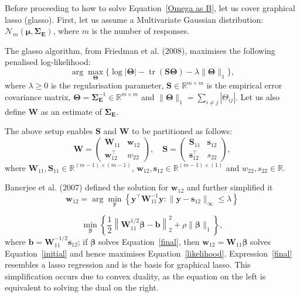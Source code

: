 Before proceeding to how to solve Equation~\ref{Omega as B}, let us cover graphical lasso (glasso). First, let us assume a Multivariate Gaussian distribution:
\(\mathcal{N}_m(\boldsymbol{\mu},\mathbf{\Sigma_E})\), where $m$ is the number of responses. 

The glasso algorithm, from Friedman et al. (2008), maximises the following penalised log-likelihood:
\begin{equation}
\arg \max_{\boldsymbol{\Theta}}\{ \log |\boldsymbol{\Theta}| - \operatorname{tr}(\mathbf{S} \boldsymbol{\Theta}) - \lambda \|\boldsymbol{\Theta}\|_1\},
\label{likelihood}
\end{equation}
where $\lambda \geq 0$ is the regularisation parameter, $\mathbf{S}\in \mathbb{R}^{m \times m}$ is the empirical error covariance matrix, $\mathbf{\Theta} = \mathbf{\Sigma}^{-1}_\mathbf{E} \in \mathbb{R}^{m \times m}$ and $\|\boldsymbol{\Theta}\|_1 = \sum_{i \ne j} |\Theta_{ij}|$. Let us also define $\mathbf{W}$ as an estimate of $\mathbf{\Sigma_E}$.

The above setup enables $\mathbf{S}$ and $\mathbf{W}$ to be partitioned as follows:
\[
\mathbf{W} = 
\begin{pmatrix}
\mathbf{W}_{11} & \mathbf{w}_{12} \\
\mathbf{w}_{12}^\top & {w}_{22}
\end{pmatrix},
\quad
\mathbf{S} = 
\begin{pmatrix}
\mathbf{S}_{11} & \mathbf{s}_{12} \\
\mathbf{s}_{12}^\top & {s}_{22}
\end{pmatrix},
\]
where $\mathbf{W}_{11}, \mathbf{S}_{11} \in \mathbb{R}^{(m-1) \times (m-1)}$, $\mathbf{w}_{12}, \mathbf{s}_{12} \in \mathbb{R}^{(m-1) \times (1)}$ and $w_{22}, s_{22} \in \mathbb{R}$. 

Banerjee et al. (2007) defined the solution for $\mathbf{w}_{12}$ and further simplified it
\begin{equation}
\mathbf{w}_{12} = \arg\min_{\mathbf{y}} \left\{ \mathbf{y}^\top \mathbf{W}_{11}^{-1} \mathbf{y} : \|\mathbf{y} - \mathbf{s}_{12}\|_\infty \leq \lambda \right\}
\label{initial}
\end{equation}

\begin{equation}
\min_{\boldsymbol{\beta}} \left\{ \frac{1}{2} \left\| \mathbf{W}_{11}^{1/2} \boldsymbol{\beta} - \mathbf{b} \right\|_2^2 + \rho \|\boldsymbol{\beta}\|_1 \right\},
\label{final}
\end{equation}
where \( \mathbf{b} = \mathbf{W}_{11}^{-1/2} \mathbf{s}_{12} \); if \( \boldsymbol{\beta} \) solves Equation~\ref{final}, then \( \mathbf{w}_{12} = \mathbf{W}_{11} \boldsymbol{\beta} \) solves Equation~\ref{initial} and hence maximises Equation~\ref{likelihood}. Expression~\ref{final} resembles a lasso regression and is the basis for graphical lasso. This simplification occurs due to convex duality, as the equation on the left is equivalent to solving the dual on the right.\cite{friedman2008sparse}

